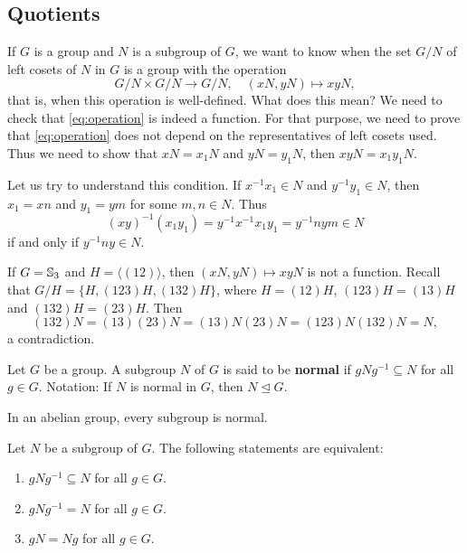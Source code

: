 \section{}

\subsection{Quotients}

If $G$ is a group and $N$ is a subgroup of $G$, we want to know
when the set $G/N$ of left cosets 
of $N$ in $G$ is a group with 
the operation 
\begin{equation}
\label{eq:operation}
G/N\times G/N\to G/N,\quad 
(xN,yN)\mapsto xyN,
\end{equation}
that is, when this operation 
is well-defined. 
What does this mean? We need to check that
\eqref{eq:operation} is indeed a function. 
For that purpose, we need to prove that
\eqref{eq:operation} does not depend on the representatives of left
cosets used. Thus we need to show that 
$xN=x_1N$ and $yN=y_1N$, then 
$xyN=x_1y_1N$. 

Let us try to understand this condition. If $x^{-1}x_1\in N$ and 
$y^{-1}y_1\in N$, then $x_1=xn$ and $y_1=ym$ for some 
$m,n\in N$. Thus 
\[
(xy)^{-1}(x_1y_1)=y^{-1}x^{-1}x_1y_1=y^{-1}nym\in N
\]
if and only if $y^{-1}ny\in N$.

\begin{example}
If $G=\mathbb{S}_3$ and $H=\langle (12)\rangle$, then $(xN,yN)\mapsto xyN$ is not a function. Recall that 
$G/H=\{H,(123)H,(132)H\}$, where 
$H=(12)H$, $(123)H=(13)H$ and $(132)H=(23)H$. Then 
\[
(132)N=(13)(23)N=(13)N(23)N=(123)N(132)N=N,
\]
a contradiction.
\end{example}

\begin{definition}
    Let $G$ be a group. 
    A subgroup $N$ of $G$ is said to be \textbf{normal} if $gNg^{-1}\subseteq N$ for all $g\in G$.
    Notation: If $N$ is normal in $G$, then $N\unlhd G$.
\end{definition}

In an abelian group, every subgroup is normal. 

\begin{proposition}
\label{pro:normalidad}
Let $N$ be a subgroup of $G$. 
The following statements are equivalent:
\begin{enumerate}
        \item $gNg^{-1}\subseteq N$ for all $g\in G$.
        \item $gNg^{-1}=N$ for all $g\in G$.
        \item $gN=Ng$ for all $g\in G$.
\end{enumerate}
\end{proposition}

